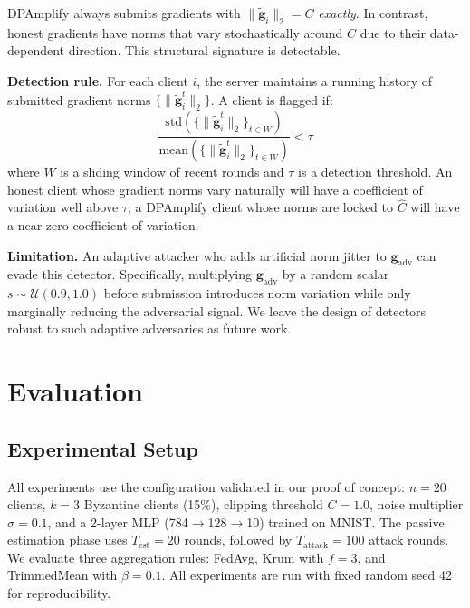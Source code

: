 \documentclass[conference]{IEEEtran}
\begin{document}
DPAmplify always submits gradients with
$\|\tilde{\mathbf{g}}_i\|_2 = C$ \emph{exactly}.
In contrast, honest gradients have norms that vary
stochastically around $C$ due to their data-dependent
direction. This structural signature is detectable.

\textbf{Detection rule.} For each client $i$, the
server maintains a running history of submitted
gradient norms $\{\|\tilde{\mathbf{g}}_i^t\|_2\}$.
A client is flagged if:
\begin{equation}
    \frac{\mathrm{std}(\{\|\tilde{\mathbf{g}}_i^t
    \|_2\}_{t \in W})}
    {\mathrm{mean}(\{\|\tilde{\mathbf{g}}_i^t
    \|_2\}_{t \in W})}
    < \tau
    \label{eq:audit}
\end{equation}
where $W$ is a sliding window of recent rounds and
$\tau$ is a detection threshold. An honest client
whose gradient norms vary naturally will have a
coefficient of variation well above $\tau$; a
DPAmplify client whose norms are locked to $\hat{C}$
will have a near-zero coefficient of variation.

\textbf{Limitation.} An adaptive attacker who adds
artificial norm jitter to $\mathbf{g}_{\mathrm{adv}}$
can evade this detector. Specifically, multiplying
$\mathbf{g}_{\mathrm{adv}}$ by a random scalar
$s \sim \mathcal{U}(0.9, 1.0)$ before submission
introduces norm variation while only marginally
reducing the adversarial signal. We leave the design
of detectors robust to such adaptive adversaries as
future work.

\section{Evaluation}
\label{sec:eval}

\subsection{Experimental Setup}

All experiments use the configuration validated in our
proof of concept: $n = 20$ clients, $k = 3$ Byzantine
clients (15\%), clipping threshold $C = 1.0$, noise
multiplier $\sigma = 0.1$, and a 2-layer MLP
(784$\to$128$\to$10) trained on MNIST. The passive
estimation phase uses $T_{\mathrm{est}} = 20$ rounds,
followed by $T_{\mathrm{attack}} = 100$ attack rounds.
We evaluate three aggregation rules: FedAvg, Krum
with $f=3$, and TrimmedMean with $\beta = 0.1$.
All experiments are run with fixed random seed 42
for reproducibility.
\end{document}
